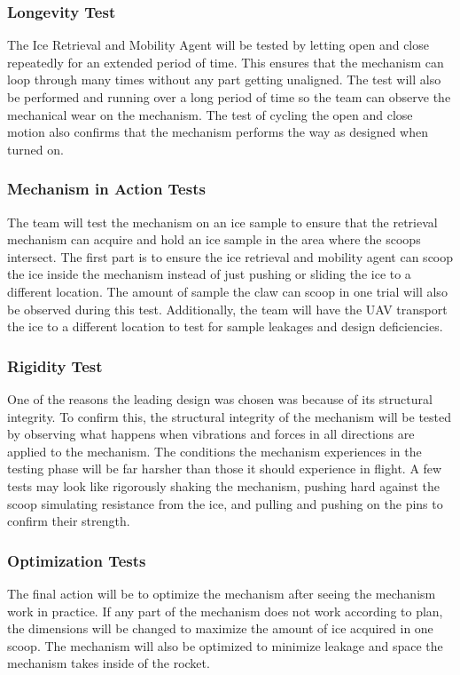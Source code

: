 		\subsubsection{Longevity Test}
		The Ice Retrieval and Mobility Agent will be tested by letting open and close repeatedly for an extended period of time. This ensures that the mechanism can loop through many times without any part getting unaligned. The test will also be performed and running over a long period of time so the team can observe the mechanical wear on the mechanism. The test of cycling the open and close motion also confirms that the mechanism performs the way as designed when turned on. 
		\subsubsection{Mechanism in Action Tests}
		The team will test the mechanism on an ice sample to ensure that the retrieval mechanism can acquire and hold an ice sample in the area where the scoops intersect. The first part is to ensure the ice retrieval and mobility agent can scoop the ice inside the mechanism instead of just pushing or sliding the ice to a different location. The amount of sample the claw can scoop in one trial will also be observed during this test. Additionally, the team will have the UAV transport the ice to a different location to test for sample leakages and design deficiencies.
		\subsubsection{Rigidity Test}
		One of the reasons the leading design was chosen was because of its structural integrity. To confirm this, the structural integrity of the mechanism will be tested by observing what happens when vibrations and forces in all directions are applied to the mechanism. The conditions the mechanism experiences in the testing phase will be far harsher than those it should experience in flight. A few tests may look like rigorously shaking the mechanism, pushing hard against the scoop simulating resistance from the ice, and pulling and pushing on the pins to confirm their strength. 
		\subsubsection{Optimization Tests}
		The final action will be to optimize the mechanism after seeing the mechanism work in practice. If any part of the mechanism does not work according to plan, the dimensions will be changed to maximize the amount of ice acquired in one scoop. The mechanism will also be optimized to minimize leakage and space the mechanism takes inside of the rocket.   

